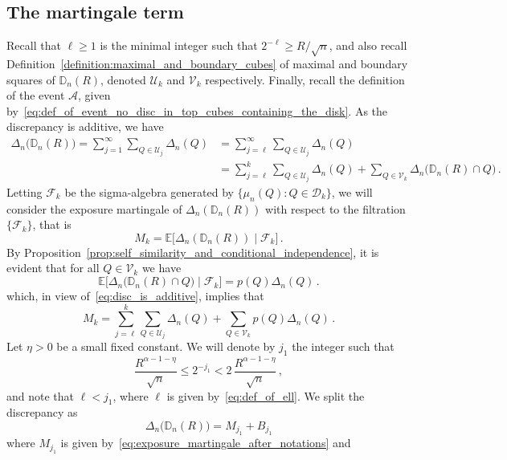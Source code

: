 \documentclass[11pt]{amsart}
\theoremstyle{definition}
\theoremstyle{remark}
\numberwithin{equation}{section}
\newcommand{\bD}{\mathbb D}
\newcommand{\bE}{\mathbb E}
\begin{document}
	\subsection{The martingale term}
	Recall that $\ell \ge 1$ is the minimal integer such that $2^{-\ell} \ge R/\sqrt{n}$, and also recall Definition~\ref{definition:maximal_and_boundary_cubes} of maximal and boundary squares of $\bD_n(R)$, denoted $\mathcal{U}_k$ and $\mathcal{V}_k$ respectively. Finally, recall the definition of the event $\mathcal{A}$, given by~\eqref{eq:def_of_event_no_disc_in_top_cubes_containing_the_disk}. As the discrepancy is additive, we have
	\begin{align}
		\label{eq:disc_is_additive}
		\nonumber
		\Delta_n\big(\bD_n(R)\big) = \sum_{j=1}^{\infty} \sum_{Q\in \mathcal{U}_j} \Delta_n(Q) &=\sum_{j=\ell}^{\infty} \sum_{Q\in \mathcal{U}_j} \Delta_n(Q) \\ &= \sum_{j=\ell}^{k} \sum_{Q\in \mathcal{U}_j} \Delta_n(Q) + \sum_{Q\in \mathcal{V}_k} \Delta_n\big(\bD_n(R) \cap Q\big)\, .
	\end{align} 
	Letting $\mathcal{F}_k$ be the sigma-algebra generated by $\big\{\mu_n(Q) : Q\in \mathcal{D}_k\big\}$, we will consider the exposure martingale of $\Delta_n(\bD_n(R))$ with respect to the filtration $\{\mathcal{F}_k\}$, that is
	\[
	M_k = \bE\big[\Delta_n(\bD_n(R)) \mid \mathcal{F}_k\big] \, .
	\]
	By Proposition~\ref{prop:self_similarity_and_conditional_independence}, it is evident that for all $Q\in \mathcal{V}_k$ we have
	\[
	\bE\big[\Delta_n\big(\bD_n(R) \cap Q\big) \mid \mathcal{F}_k\big] = p(Q) \Delta_n(Q) \, .
	\]
	which, in view of~\eqref{eq:disc_is_additive}, implies that
	\begin{equation}
		\label{eq:exposure_martingale_after_notations}
		M_k = \sum_{j=\ell}^{k} \sum_{Q\in\mathcal{U}_j} \Delta_n(Q) + \sum_{Q\in \mathcal{V}_k} p(Q)\Delta_n(Q) \, .
	\end{equation}
	Let $\eta>0$ be a small fixed constant. We will denote by $j_1$ the integer such that 
	\begin{equation}
		\label{eq:def_of_j_1}
		\frac{R^{\alpha-1-\eta}}{\sqrt{n}} \le 2^{-j_1} < 2 \, \frac{R^{\alpha -1 -\eta}}{\sqrt{n}} \, ,
	\end{equation}
	and note that $\ell < j_1$, where $\ell$ is given by~\eqref{eq:def_of_ell}. We split the discrepancy as
	\begin{equation*}
		\Delta_n\big(\bD_n(R)\big) = M_{j_1} + B_{j_1}
	\end{equation*} 
	where $M_{j_1}$ is given by~\eqref{eq:exposure_martingale_after_notations} and
\end{document}
